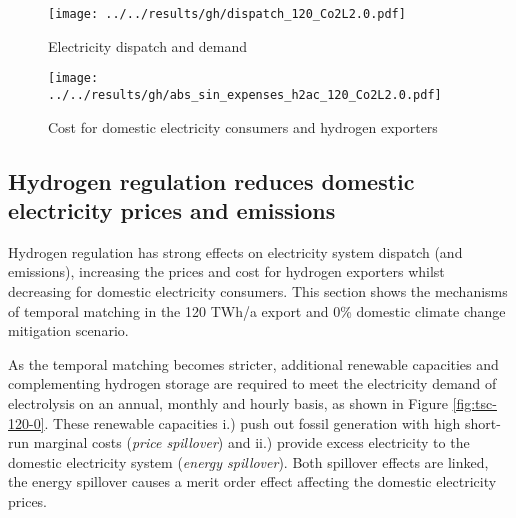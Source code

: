\begin{figure*}[h!]
    \centering
    \begin{subfigure}[b]{0.49\linewidth}
        \centering
        \texttt{[image: ../../results/gh/dispatch\_120\_Co2L2.0.pdf]}
        \caption{Electricity dispatch and demand}
        \label{fig:dispatch_rule}
    \end{subfigure}
    \hfill
    \begin{subfigure}[b]{0.49\linewidth}
        \centering
        \texttt{[image: ../../results/gh/abs\_sin\_expenses\_h2ac\_120\_Co2L2.0.pdf]}
        \caption{Cost for domestic electricity consumers and hydrogen exporters}
        \label{fig:expense_h2ac}
    \end{subfigure}
    \hfill
    \caption{Electricity dispatch and demand (\ref{fig:dispatch_rule}) and cost for consumers (\ref{fig:expense_h2ac}) for various (hydrogen) temporal matching regimes in the 120 TWh/a export and 0\% climate change mitigation scenario. Stricter temporal matching decreases carbon-intensive electricity generation (coal \& gas) for hydrogen generation and even domestic electricity consumers (s. Fig. \ref{fig:dispatch_rule}). Cost for export hydrogen generation increase to fulfill the temporal matching constraint, whereas domestic electricity consumers profit from stricter hydrogen regulation.}
    \label{fig:expenses_rule}
\end{figure*}


\subsection*{Hydrogen regulation reduces domestic electricity prices and emissions}
\label{subsec:benefits_rule}

Hydrogen regulation has strong effects on electricity system dispatch (and emissions), increasing the prices and cost for hydrogen exporters whilst decreasing for domestic electricity consumers. This section shows the mechanisms of temporal matching in the 120 TWh/a export and 0\% domestic climate change mitigation scenario.

As the temporal matching becomes stricter, additional renewable capacities and complementing hydrogen storage are required to meet the electricity demand of electrolysis on an annual, monthly and hourly basis, as shown in Figure \ref{fig:tsc-120-0}. These renewable capacities i.) push out fossil generation with high short-run marginal costs (\textit{price spillover}) and ii.) provide excess electricity to the domestic electricity system (\textit{energy spillover}). Both spillover effects are linked, the energy spillover causes a merit order effect affecting the domestic electricity prices.

